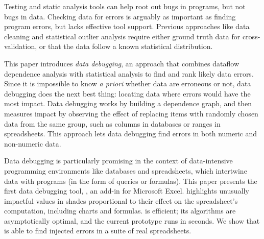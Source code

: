Testing and static analysis tools can help root out bugs in programs,
but not bugs in data. Checking data for errors is arguably as
important as finding program errors, but lacks effective tool
support. Previous approaches like data cleaning and statistical
outlier analysis require either ground truth data for
cross-validation, or that the data follow a known statistical
distribution.

This paper introduces \emph{data debugging}, an approach that combines
dataflow dependence analysis with statistical analysis to find and
rank likely data errors. Since it is impossible to know \emph{a
priori} whether data are erroneous or not, data debugging does the
next best thing: locating data where errors would have the most
impact. Data debugging works by building a dependence graph, and then
measures impact by observing the effect of replacing items with
randomly chosen data from the same group, such as columns in databases
or ranges in spreadsheets. This approach lets data debugging find
errors in both numeric and non-numeric data.

Data debugging is particularly promising in the context of
data-intensive programming environments like databases and
spreadsheets, which intertwine data with programs (in the form of
queries or formulas). This paper presents the first data debugging
tool, \checkcell{}, an add-in for Microsoft Excel. \checkcell{}
highlights unusually impactful values in shades proportional to their
effect on the spreadsheet's computation, including charts and
formulas. \checkcell{} is efficient; its algorithms are asymptotically
optimal, and the current prototype runs in seconds. We show
that \checkcell{} is able to find injected errors in a suite of real
spreadsheets.

